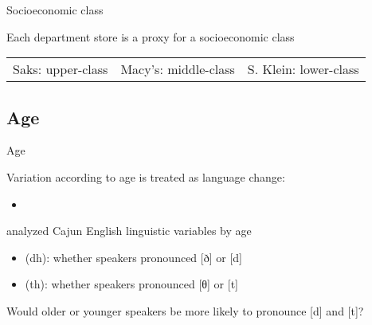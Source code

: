 \documentclass{beamer}
\newcommand{\subonetwo}{Socioeconomic class}
\newcommand{\subonethree}{Age}
\begin{document}
      \begin{frame}[t]{\subonetwo}
        \begin{block}{Each department store is a proxy for a socioeconomic class}
          {\small
            \begin{tabular}{l | l | l}
              Saks: upper-class & Macy's: middle-class & S. Klein: lower-class
            \end{tabular}
          }
        \end{block}
      \end{frame}

    \subsection{\subonethree}
      \begin{frame}{\subonethree}
        \begin{block}{}
          Variation according to age is treated as \alert{language change}:
          \begin{itemize}
            \item 
          \end{itemize}
        \end{block}
        \begin{block}{\textcite{dubois_when_1999} analyzed Cajun English linguistic variables by age}
          \begin{itemize}
            \item (dh): whether speakers pronounced [ð] or [d]
            \item (th): whether speakers pronounced [θ] or [t]
          \end{itemize}
        \end{block}
        \begin{block}{}
          Would older or younger speakers be more likely to pronounce [d] and [t]?
        \end{block}
      \end{frame}
\end{document}
